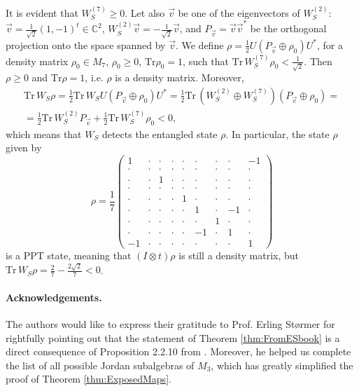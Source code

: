 \documentclass[12pt]{article}
\theoremstyle{plain}
\theoremstyle{definition}
\theoremstyle{remark}
\numberwithin{equation}{section}
\begin{document}
It is evident that $W_{S}^{(7)} \geq 0$. 
Let also $\vec{v}$ be one of the eigenvectors of $W_{S}^{(2)}$: 
$\vec{v} = \frac{1}{\sqrt{2}} (1,-1)^{t} \in \mathbb{C}^{2}$,
$W_{S}^{(2)} \vec{v} = - \frac{1}{\sqrt{2}} \vec{v}$, and
$P_{\vec{v}} = \vec{v} \vec{v}^{*}$
be the orthogonal projection onto the space spanned by $\vec{v}$.
We define
$\rho = \frac{1}{2} U ( P_{\vec{v}} \oplus \rho_{0} ) U^{*}$,
for a density matrix $\rho_{0} \in M_{7}$, 
$\rho_{0} \geq 0$, $\text{Tr} \rho_{0} = 1$, 
such that
$\text{Tr}\, W_{S}^{(7)} \rho_{0} < \frac{1}{\sqrt{2}}$.
Then $\rho \geq 0$ and $\text{Tr} \rho = 1$,
i.e. $\rho$ is a density matrix.
Moreover,
\begin{multline}
\label{RandomLabel:851252}
    \text{Tr}\, W_{S} \rho =
\frac{1}{2} \text{Tr}\, W_{S} U (P_{\vec{v}} \oplus \rho_{0}) U^{*} =
\frac{1}{2} \text{Tr}\, (W_{S}^{(2)} \oplus W_{S}^{(7)}) (P_{\vec{v}} \oplus \rho_{0}) = \\ =
\frac{1}{2} \text{Tr}\, W_{S}^{(2)} P_{\vec{v}} + \frac{1}{2} \text{Tr}\, W_{S}^{(7)} \rho_{0}
< 0,
\end{multline}
which means that $W_{S}$ detects the entangled state $\rho$.
In particular, the state $\rho$ given by
\begin{equation}
\label{PPTstate}
 \rho =  \frac{1}{7} \left( \begin{array}{ccc|ccc|ccc}
 1 &  \cdot& \cdot& \cdot& \cdot& \cdot& \cdot& \cdot& -1 \\
 \cdot& \cdot& \cdot& \cdot& \cdot& \cdot& \cdot& \cdot& \cdot\\
 \cdot& \cdot& 1 & \cdot& \cdot& \cdot& \cdot& \cdot& \cdot  \\ \hline
 \cdot& \cdot& \cdot& \cdot& \cdot& \cdot& \cdot& \cdot&  \cdot \\
 \cdot& \cdot& \cdot& \cdot& 1 & \cdot& \cdot& \cdot&  \cdot \\
 \cdot& \cdot& \cdot& \cdot& \cdot& 1 & \cdot & -1 & \cdot  \\ \hline
 \cdot& \cdot& \cdot & \cdot& \cdot& \cdot& 1& \cdot& \cdot  \\ 
 \cdot & \cdot& \cdot& \cdot& \cdot& -1 & \cdot& 1 & \cdot \\
 -1 & \cdot& \cdot& \cdot& \cdot & \cdot& \cdot& \cdot& 1
  \end{array} \right)
\end{equation}
is a PPT state, meaning that $(I \otimes t)\rho$ is still a density matrix,
but $\text{Tr}\, W_{S} \rho = \frac{2}{7} - \frac{2\sqrt{2}}{7} < 0$.


\paragraph{Acknowledgements.}
The authors would like to express their gratitude to Prof. Erling Størmer
for rightfully pointing out that the statement of Theorem \ref{thm:FromESbook}
is a direct consequence of Proposition 2.2.10 from
\cite{stormer2013positive}.
Moreover, he helped us complete the list of all possible Jordan subalgebras
of $M_{3}$, which has greatly simplified the proof 
of Theorem \ref{thm:ExposedMaps}.






\end{document}
